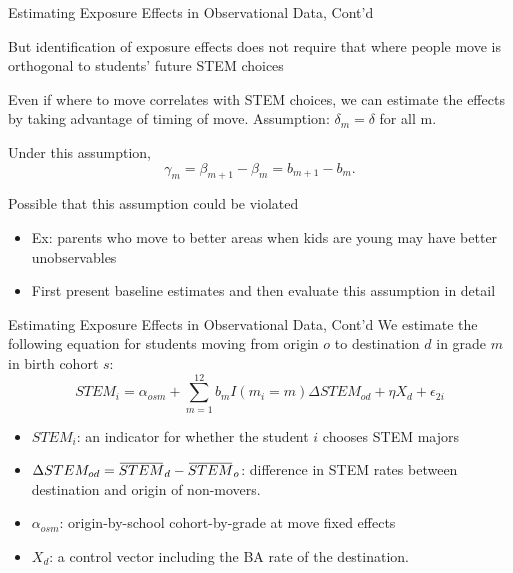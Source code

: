 \documentclass[aspectratio=169,xcolor=dvipsnames]{beamer}
\newcommand{\overbar}[1]{\mkern 1.5mu\overline{\mkern-1.5mu#1\mkern-1.5mu}\mkern 1.5mu}
\newenvironment{wideitemize}{\itemize\addtolength{\itemsep}{10pt}}{\enditemize}
\begin{document}
\begin{frame}{Estimating Exposure Effects in Observational Data, Cont'd}
\begin{wideitemize}
    \item But identification of exposure effects does not require that where people move is orthogonal to students’ future STEM choices
    \item Even if where to move correlates with STEM choices, we can estimate the effects by taking advantage of timing of move.
    Assumption: $\delta_m = \delta$  for all m.
    \item Under this assumption, $$\gamma_m = \beta_{m+1} - \beta_{m} = b_{m+1} - b_{m}.$$
    \item Possible that this assumption could be violated
    \begin{itemize}
        \item Ex: parents who move to better areas when kids are young may have better unobservables
        \item First present baseline estimates and then evaluate this assumption in detail
    \end{itemize}
\end{wideitemize}
 
\end{frame}

\begin{frame}{Estimating Exposure Effects in Observational Data, Cont'd}
    We estimate the following equation for students moving from origin $o$ to destination $d$ in grade $m$ in birth cohort $s$:
    \begin{equation}
        STEM_i = \alpha_{osm} +  \sum_{m=1}^{12} b_mI(m_i=m) \Delta STEM_{od} + \eta X_{d} + \epsilon_{2i}
    \end{equation}
    \begin{itemize}
        \item $STEM_i$: an indicator for whether the student $i$ chooses STEM majors
        \item $\Delta STEM_{od} = \overbar{STEM}_d -  \overbar{STEM}_o$: difference in STEM rates between destination and origin of non-movers.
        \item $\alpha_{osm}$: origin-by-school cohort-by-grade at move fixed effects
        \item $X_{d}$: a control vector including the BA rate of the destination.
    \end{itemize}
\end{frame}
\end{document}
